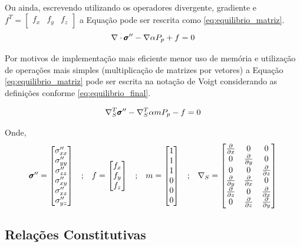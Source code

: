 Ou ainda, escrevendo utilizando os operadores divergente, gradiente e $f^T=\begin{bmatrix}f_x & f_y & f_z\end{bmatrix}$ a Equação pode ser rescrita como \eqref{eq:equilibrio_matriz}.
\begin{equation}
\label{eq:equilibrio_matriz}
\nabla \cdot \stef - \nabla \alpha P_p + f = 0
\end{equation}

Por motivos de implementação mais eficiente menor uso de memória e utilização de operações mais simples (multiplicação de matrizes por vetores) a Equação \eqref{eq:equilibrio_matriz} pode ser escrita na notação de Voigt  considerando as definições conforme \eqref{eq:equilibrio_final}.

\begin{equation}
\label{eq:equilibrio_final}
\sopnabla^T \stef - \sopnabla^T\alpha m  P_p - f = 0
\end{equation}

Onde, 
\begin{equation}
\begin{matrix}\label{eq:definicoesvoigt}
\pmb{\sigma}^{\prime\prime} = \begin{bmatrix}
\sigma^{\prime\prime}_{xx}
\\
\sigma^{\prime\prime}_{yy}
\\
\sigma^{\prime\prime}_{zz}
\\
\sigma^{\prime\prime}_{xy}
\\
\sigma^{\prime\prime}_{xz}
\\
\sigma^{\prime\prime}_{yz}
\end{bmatrix}
&

;

&

f = \begin{bmatrix}
f_{x}
\\
f_{y}
\\
f_{z}
\end{bmatrix}
&
;
&

m = \begin{bmatrix} 1 \\ 1 \\ 1 \\ 0 \\ 0 \\ 0\end{bmatrix}

&
;

&
\nabla_S = \begin{bmatrix} \frac{\partial { }}{\partial x} & 0 & 0 \\ 0 & \frac{\partial { }}{\partial y} & 0 \\ 0 & 0 & \frac{\partial { }}{\partial z} \\ \frac{\partial { }}{\partial y} & \frac{\partial { }}{\partial x} & 0 \\ \frac{\partial { }}{\partial z} & 0 & \frac{\partial { }}{\partial x} \\ 0 & \frac{\partial { }}{\partial z} & \frac{\partial { }}{\partial y} \end{bmatrix}
\end{matrix}
\end{equation}



\subsection{Relações Constitutivas}


